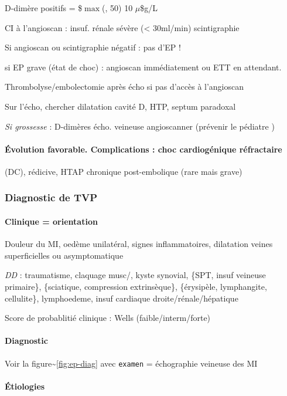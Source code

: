 \documentclass[11pt]{article}
\begin{document}
D-dimère positifs = \$\(\max\)(, 50) \texttimes{} 10 \(\mu\)\$g/L

CI à l'angioscan : insuf. rénale sévère (< 30ml/min) \thus scintigraphie

Si angioscan ou scintigraphie négatif : pas d'EP !

\begin{tcolorbox}
\danger{} si EP grave (état de choc) : angioscan immédiatement ou ETT en
attendant.

{} Thrombolyse/embolectomie après écho si pas d'accès à l'angioscan
\end{tcolorbox}

Sur l'écho, chercher dilatation cavité D, HTP, septum paradoxal

\emph{Si grossesse}  : D-dimères \thus écho. veineuse \thus angioscanner
(prévenir le pédiatre )

\paragraph{Évolution favorable. Complications : choc cardiogénique réfractaire}
\label{sec:org26bffa5}
(DC), rédicive, HTAP chronique post-embolique (rare mais grave)

\subsubsection{Diagnostic de TVP}
\label{sec:orga38c8d7}
\paragraph{Clinique = orientation}
\label{sec:org608e7d5}
Douleur du MI, oedème unilatéral, signes inflammatoires, dilatation veines
superficielles ou asymptomatique

\emph{DD}  : traumatisme, claquage musc/, kyste synovial, \{SPT, insuf veineuse
primaire\}, \{sciatique, compression extrinsèque\}, \{érysipèle, lymphangite,
cellulite\}, lymphoedeme, insuf cardiaque droite/rénale/hépatique

Score de probablitié clinique : Wells (faible/interm/forte)

\paragraph{Diagnostic}
\label{sec:orgb488bbd}
Voir la figure\textasciitilde{}\ref{fig:ep-diag} avec \texttt{examen} = échographie veineuse
des MI

\paragraph{Étiologies}
\label{sec:orga8eeb1b}
\end{document}
